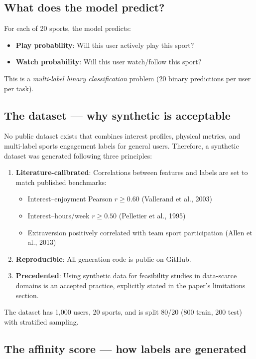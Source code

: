 \documentclass[12pt,a4paper]{article}
\begin{document}
\subsection{What does the model predict?}

For each of 20 sports, the model predicts:
\begin{itemize}
\item \textbf{Play probability}: Will this user actively play this sport?
\item \textbf{Watch probability}: Will this user watch/follow this sport?
\end{itemize}
This is a \emph{multi-label binary classification} problem (20 binary
predictions per user per task).

\subsection{The dataset --- why synthetic is acceptable}

No public dataset exists that combines interest profiles, physical metrics,
and multi-label sports engagement labels for general users. Therefore, a
synthetic dataset was generated following three principles:

\begin{enumerate}
\item \textbf{Literature-calibrated}: Correlations between features and
labels are set to match published benchmarks:
  \begin{itemize}
  \item Interest--enjoyment Pearson $r \geq 0.60$ (Vallerand et al., 2003)
  \item Interest--hours/week $r \geq 0.50$ (Pelletier et al., 1995)
  \item Extraversion positively correlated with team sport participation
        (Allen et al., 2013)
  \end{itemize}
\item \textbf{Reproducible}: All generation code is public on GitHub.
\item \textbf{Precedented}: Using synthetic data for feasibility studies in
data-scarce domains is an accepted practice, explicitly stated in the paper's
limitations section.
\end{enumerate}

The dataset has 1,000 users, 20 sports, and is split 80/20 (800 train,
200 test) with stratified sampling.

\subsection{The affinity score --- how labels are generated}
\end{document}
